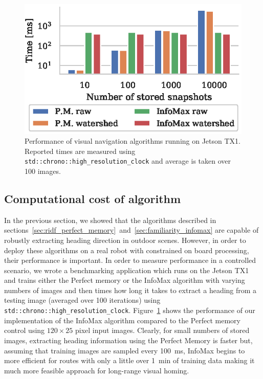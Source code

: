 \documentclass[letterpaper]{article}
\begin{document}
\begin{figure}[t]
    \centering
    \includegraphics{figures/jetson_test_performance.eps}
    \caption{Performance of visual navigation algorithms running on Jetson TX1. 
    Reported times are measured using \lstinline{std::chrono::high_resolution_clock} and average is taken over \num{100} images.}
    \label{fig:jetson_test_performance}
\end{figure}

\subsection{Computational cost of algorithm}
In the previous section, we showed that the algorithms described in sections~\ref{sec:ridf_perfect_memory}~and~\ref{sec:familiarity_infomax} are capable of robustly extracting heading direction in outdoor scenes. 
However, in order to deploy these algorithms on a real robot with constrained on board processing, their performance is important. 
In order to measure performance in a controlled scenario, we wrote a benchmarking application which runs on the Jetson TX1 and trains either the Perfect memory or the InfoMax algorithm with varying numbers of images and then times how long it takes to extract a heading from a testing image (averaged over \num{100} iterations) using \lstinline{std::chrono::high_resolution_clock}.
Figure~\ref{fig:jetson_test_performance} shows the performance of our implementation of the InfoMax algorithm compared to the Perfect memory control using $120 \times 25$ pixel input images.
Clearly, for small numbers of stored images, extracting heading information using the Perfect Memory is faster but, assuming that training images are sampled every \SI{100}{\milli\second}, InfoMax begins to more efficient for routes with only a little over \SI{1}{\minute} of training data making it much more feasible approach for long-range visual homing.
\end{document}
